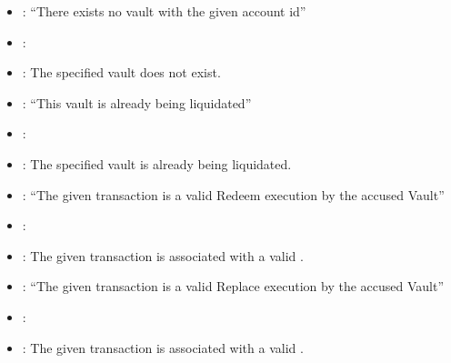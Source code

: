 \documentclass[a4paper,10pt,english]{sphinxmanual}
\begin{document}
\begin{itemize}
\item {} 
: “There exists no vault with the given account id”

\item {} 
: {\hyperref[\detokenize{spec/staked-relayers:reportvaulttheft}]{}}

\item {} 
:  The specified vault does not exist.

\end{itemize}

\begin{itemize}
\item {} 
: “This vault is already being liquidated”

\item {} 
: {\hyperref[\detokenize{spec/staked-relayers:reportvaulttheft}]{}}

\item {} 
:  The specified vault is already being liquidated.

\end{itemize}

\begin{itemize}
\item {} 
: “The given transaction is a valid Redeem execution by the accused Vault”

\item {} 
: {\hyperref[\detokenize{spec/staked-relayers:reportvaulttheft}]{}}

\item {} 
: The given transaction is associated with a valid {\hyperref[\detokenize{spec/redeem:redeem-protocol}]{}}.

\end{itemize}

\begin{itemize}
\item {} 
: “The given transaction is a valid Replace execution by the accused Vault”

\item {} 
: {\hyperref[\detokenize{spec/staked-relayers:reportvaulttheft}]{}}

\item {} 
: The given transaction is associated with a valid {\hyperref[\detokenize{spec/replace:replace-protocol}]{}}.

\end{itemize}
\end{document}
